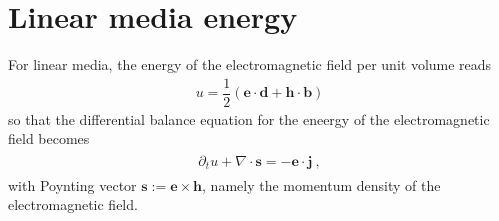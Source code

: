 \documentclass[letterpaper,10pt,italian]{jupyterBook}
\begin{document}
\section{Linear media \sphinxhyphen{} energy}
\label{\detokenize{ch/energy-linear:linear-media-energy}}
\sphinxAtStartPar
For linear media, the energy of the electromagnetic field per unit volume reads
\begin{equation*}
\begin{split}u = \dfrac{1}{2} \left( \mathbf{e} \cdot \mathbf{d} + \mathbf{h} \cdot \mathbf{b} \right)\end{split}
\end{equation*}
\sphinxAtStartPar
so that the differential balance equation for the eneergy of the electromagnetic field becomes
\begin{equation*}
\begin{split}\begin{aligned}
 \partial_t u + \nabla \cdot \mathbf{s} = - \mathbf{e} \cdot \mathbf{j} \ ,
\end{aligned}\end{split}
\end{equation*}
\sphinxAtStartPar
with Poynting vector \(\mathbf{s} := \mathbf{e} \times \mathbf{h}\), namely the momentum density of the electromagnetic field.
\end{document}
